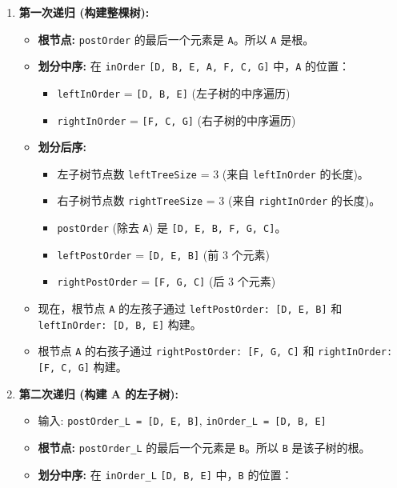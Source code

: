 \begin{enumerate}
	\item \textbf{第一次递归 (构建整棵树):}
	\begin{itemize}
		\item \textbf{根节点:} \lstinline{postOrder} 的最后一个元素是 \lstinline{A}。所以 \lstinline{A} 是根。
		\item \textbf{划分中序:} 在 \lstinline{inOrder} \lstinline{[D, B, E, A, F, C, G]} 中，\lstinline{A} 的位置：
		\begin{itemize}
			\item \lstinline{leftInOrder} = \lstinline{[D, B, E]} (左子树的中序遍历)
			\item \lstinline{rightInOrder} = \lstinline{[F, C, G]} (右子树的中序遍历)
		\end{itemize}
		\item \textbf{划分后序:}
		\begin{itemize}
			\item 左子树节点数 \lstinline{leftTreeSize} = 3 (来自 \lstinline{leftInOrder} 的长度)。
			\item 右子树节点数 \lstinline{rightTreeSize} = 3 (来自 \lstinline{rightInOrder} 的长度)。
			\item \lstinline{postOrder} (除去 \lstinline{A}) 是 \lstinline{[D, E, B, F, G, C]}。
			\item \lstinline{leftPostOrder} = \lstinline{[D, E, B]} (前 3 个元素)
			\item \lstinline{rightPostOrder} = \lstinline{[F, G, C]} (后 3 个元素)
		\end{itemize}
		\item 现在，根节点 \lstinline{A} 的左孩子通过 \lstinline{leftPostOrder: [D, E, B]} 和 \lstinline{leftInOrder: [D, B, E]} 构建。
		\item 根节点 \lstinline{A} 的右孩子通过 \lstinline{rightPostOrder: [F, G, C]} 和 \lstinline{rightInOrder: [F, C, G]} 构建。
	\end{itemize}
	\item \textbf{第二次递归 (构建 A 的左子树):}
	\begin{itemize}
		\item 输入: \lstinline{postOrder_L = [D, E, B]}, \lstinline{inOrder_L = [D, B, E]}
		\item \textbf{根节点:} \lstinline{postOrder_L} 的最后一个元素是 \lstinline{B}。所以 \lstinline{B} 是该子树的根。
		\item \textbf{划分中序:} 在 \lstinline{inOrder_L} \lstinline{[D, B, E]} 中，\lstinline{B} 的位置：
		\begin{itemize}

\end{itemize}
\end{itemize}
\end{enumerate}
